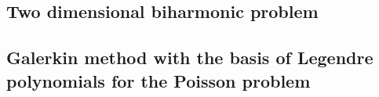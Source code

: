 \documentclass[a4paper,10pt]{article}
\begin{document}
  \subsection{Two dimensional biharmonic problem}
  \subsection{Galerkin method with the basis of Legendre polynomials for the
  Poisson problem}

 
\end{document}
